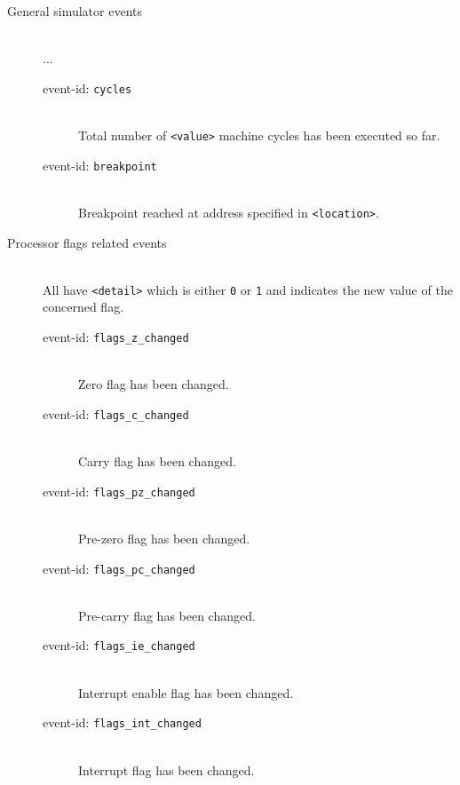         \begin{description}
            \item[General simulator events]~\\
                ...
                \begin{description}
                    \item[event-id: \texttt{cycles}]~\\
                        Total number of \texttt{<value>} machine cycles has been executed so far.
                    \item[event-id: \texttt{breakpoint}]~\\
                        Breakpoint reached at address specified in \texttt{<location>}.
                \end{description}
            \item[Processor flags related events]~\\
                All have \texttt{<detail>} which is either \texttt{0} or \texttt{1} and indicates the new value of the concerned flag.
                \begin{description}
                    \item[event-id: \texttt{flags\_z\_changed}]~\\
                        Zero flag has been changed.
                    \item[event-id: \texttt{flags\_c\_changed}]~\\
                        Carry flag has been changed.
                    \item[event-id: \texttt{flags\_pz\_changed}]~\\
                        Pre-zero flag has been changed.
                    \item[event-id: \texttt{flags\_pc\_changed}]~\\
                        Pre-carry flag has been changed.
                    \item[event-id: \texttt{flags\_ie\_changed}]~\\
                        Interrupt enable flag has been changed.
                    \item[event-id: \texttt{flags\_int\_changed}]~\\
                        Interrupt flag has been changed.
                \end{description}
        \end{description}
